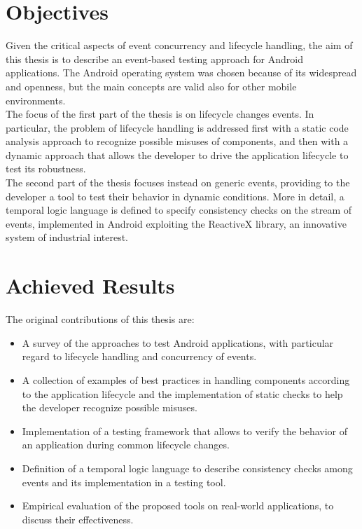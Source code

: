 \documentclass[11pt,a4paper,notitlepage]{article}
\begin{document}
\section{Objectives}
Given the critical aspects of event concurrency and lifecycle handling, the aim of this thesis is to describe an event-based testing approach for Android applications. The Android operating system was chosen because of its widespread and openness, but the main concepts are valid also for other mobile environments.\bigskip \\
The focus of the first part of the thesis is on lifecycle changes events. In particular, the problem of lifecycle handling is addressed first with a static code analysis approach to recognize possible misuses of components, and then with a dynamic approach that allows the developer to drive the application lifecycle to test its robustness.\bigskip \\
The second part of the thesis focuses instead on generic events, providing to the developer a tool to test their behavior in dynamic conditions. More in detail, a temporal logic language is defined to specify consistency checks on the stream of events, implemented in Android exploiting the ReactiveX library, an innovative system of industrial interest.

\section{Achieved Results}
The original contributions of this thesis are:
\begin{itemize}
	\item A survey of the approaches to test Android applications, with particular regard to lifecycle handling and concurrency of events.
	\item A collection of examples of best practices in handling components according to the application lifecycle and the implementation of static checks to help the developer recognize possible misuses.
	\item Implementation of a testing framework that allows to verify the behavior of an application during common lifecycle changes.
	\item Definition of a temporal logic language to describe consistency checks among events and its implementation in a testing tool.
	\item Empirical evaluation of the proposed tools on real-world applications, to discuss their effectiveness.
\end{itemize}
\end{document}

